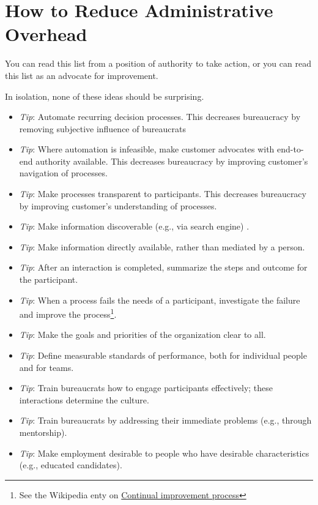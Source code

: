 \section{How to Reduce Administrative Overhead\label{sec:reducing-overhead}}

You can read this list from a position of authority to take action, or you can read this list as an advocate for improvement. 

In isolation, none of these ideas should be surprising.
\begin{itemize}
    \item \textit{Tip}: Automate recurring decision processes. This decreases bureaucracy by removing subjective influence of bureaucrats
\item \textit{Tip}: Where automation is infeasible, make customer advocates with end-to-end authority available. 
This decreases bureaucracy by improving customer's navigation of processes.
\item \textit{Tip}: Make processes transparent to participants. 
This decreases bureaucracy by improving customer's understanding of processes.
\item \textit{Tip}: Make information discoverable (e.g., via search engine) .
\item \textit{Tip}: Make information directly available, rather than mediated by a person.
\item \textit{Tip}: After an interaction is completed, summarize the steps and outcome for the participant. 
\item \textit{Tip}: When a process fails the needs of a participant, investigate the failure and improve the process\footnote{See the Wikipedia enty on \href{https://en.wikipedia.org/wiki/Continual_improvement_process}{Continual improvement process}}. 
\item \textit{Tip}: Make the goals and priorities of the organization clear to all.
\item \textit{Tip}: Define measurable standards of performance, both for individual people and for teams.
\item \textit{Tip}: Train bureaucrats how to engage participants effectively; these interactions determine the culture.
\item \textit{Tip}: Train bureaucrats by addressing their immediate problems (e.g., through mentorship).
\item \textit{Tip}: Make employment desirable to people who have desirable characteristics (e.g., educated candidates).

\end{itemize}
